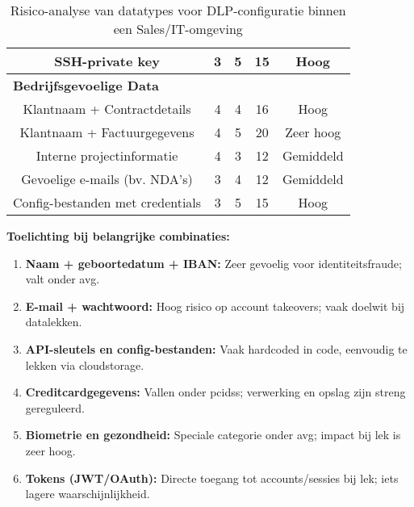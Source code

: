 \begin{table}[h]
\begin{tabular}{|c|c|c|c|c|}
    SSH-private key             & 3 & 5 & 15 & Hoog \\
    \hline
    \multicolumn{5}{|l|}{\textbf{Bedrijfsgevoelige Data}} \\
    \hline
    Klantnaam + Contractdetails & 4 & 4 & 16 & Hoog \\
    Klantnaam + Factuurgegevens & 4 & 5 & 20 & Zeer hoog \\
    Interne projectinformatie   & 4 & 3 & 12 & Gemiddeld \\
    Gevoelige e-mails (bv. NDA's) & 3 & 4 & 12 & Gemiddeld \\
    Config-bestanden met credentials & 3 & 5 & 15 & Hoog \\
    \hline
    \end{tabular}
    \caption{Risico-analyse van datatypes voor DLP-configuratie binnen een Sales/IT-omgeving}
    \label{tab:datatypes_risico_uitgebreid}
\end{table}



\textbf{Toelichting bij belangrijke combinaties:}
\begin{enumerate}
    \item \textbf{Naam + geboortedatum + IBAN:} Zeer gevoelig voor identiteitsfraude; valt onder \gls{avg}.
    \item \textbf{E-mail + wachtwoord:} Hoog risico op account takeovers; vaak doelwit bij datalekken.
    \item \textbf{API-sleutels en config-bestanden:} Vaak hardcoded in code, eenvoudig te lekken via cloudstorage.
    \item \textbf{Creditcardgegevens:} Vallen onder \gls{pcidss}; verwerking en opslag zijn streng gereguleerd.
    \item \textbf{Biometrie en gezondheid:} Speciale categorie onder \gls{avg}; impact bij lek is zeer hoog.
    \item \textbf{Tokens (JWT/OAuth):} Directe toegang tot accounts/sessies bij lek; iets lagere waarschijnlijkheid.
\end{enumerate}






